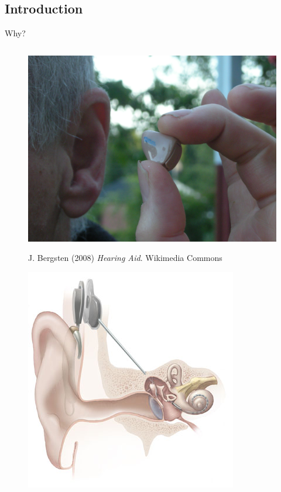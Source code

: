 \subsection{Introduction}
\begin{frame}{Why?}
	\begin{columns}[c]
	\begin{column}{0.55\textwidth}
		\only<1> {
			\begin{figure}
			\centering
			{\centering
			\includegraphics[width=\textwidth,height=0.7\textheight,keepaspectratio]{fig/Hearing_aid_20080620.jpg}
			}
			\caption{J. Bergsten (2008) \textit{Hearing Aid}. Wikimedia Commons}
			\end{figure}
		}
		 {
			\begin{figure}
			\centering
			\includegraphics[width=\textwidth,height=0.55\textheight,keepaspectratio]{fig/Cochlear_implant.jpg}

\end{figure}}
\end{column}
\end{columns}
\end{frame}
